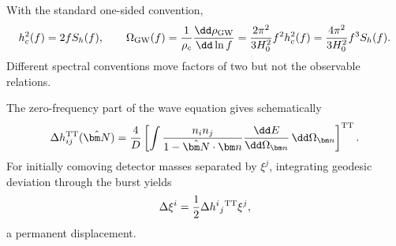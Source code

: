 \begin{solution}
With the standard one-sided convention,
\[
h_c^2(f)=2fS_h(f),\qquad
\Omega_{\rm GW}(f)
=\frac{1}{\rho_c}\frac{\dd\rho_{\rm GW}}{\dd\ln f}
=\frac{2\pi^2}{3H_0^2}f^2h_c^2(f)
=\frac{4\pi^2}{3H_0^2}f^3S_h(f).
\]
Different spectral conventions move factors of two but not the observable
relations.
\end{solution}

\begin{solution}
The zero-frequency part of the wave equation gives schematically
\[
\Delta h_{ij}^{\rm TT}(\hat{\bm N})
=\frac{4}{D}\left[
\int\frac{n_in_j}{1-\hat{\bm N}\cdot\bm n}
\frac{\dd E}{\dd\Omega_{\bm n}}\,\dd\Omega_{\bm n}
\right]^{\rm TT}.
\]
For initially comoving detector masses separated by \(\xi^j\), integrating
geodesic deviation through the burst yields
\[
\Delta\xi^i=\frac12\Delta h^i{}_j{}^{\rm TT}\xi^j,
\]
a permanent displacement.
\end{solution}
